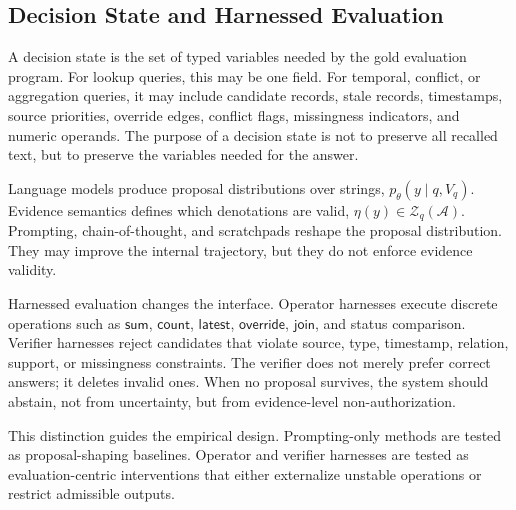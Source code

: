 \subsection{Decision State and Harnessed Evaluation}
\label{subsec:decision-state-harness}

A decision state is the set of typed variables needed by the gold evaluation program.
For lookup queries, this may be one field.
For temporal, conflict, or aggregation queries, it may include candidate records, stale records, timestamps, source priorities, override edges, conflict flags, missingness indicators, and numeric operands.
The purpose of a decision state is not to preserve all recalled text, but to preserve the variables needed for the answer.

Language models produce proposal distributions over strings, $p_\theta(y\mid q,V_q)$.
Evidence semantics defines which denotations are valid, $\eta(y)\in\mathcal Z_q(\mathcal A)$.
Prompting, chain-of-thought, and scratchpads reshape the proposal distribution.
They may improve the internal trajectory, but they do not enforce evidence validity.

Harnessed evaluation changes the interface.
Operator harnesses execute discrete operations such as $\mathsf{sum}$, $\mathsf{count}$, $\mathsf{latest}$, $\mathsf{override}$, $\mathsf{join}$, and status comparison.
Verifier harnesses reject candidates that violate source, type, timestamp, relation, support, or missingness constraints.
The verifier does not merely prefer correct answers; it deletes invalid ones.
When no proposal survives, the system should abstain, not from uncertainty, but from evidence-level non-authorization.

This distinction guides the empirical design.
Prompting-only methods are tested as proposal-shaping baselines.
Operator and verifier harnesses are tested as evaluation-centric interventions that either externalize unstable operations or restrict admissible outputs.
